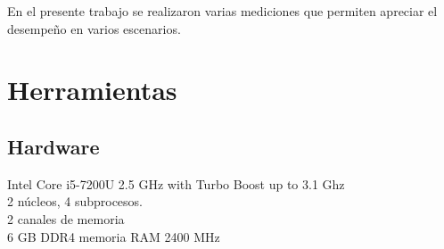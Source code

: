 \documentclass{article}
\begin{document}
En el presente trabajo se realizaron varias mediciones que permiten apreciar el desempeño en varios escenarios.

\newpage
\section{Herramientas}
\subsection{Hardware}
\begin{description}[align=right]
    \item [PC1] Intel Core i5-7200U 2.5 GHz with Turbo Boost up to 3.1 Ghz\\
        2 núcleos, 4 subprocesos.\\
        2 canales de memoria\\
        6 GB DDR4 memoria RAM  2400 MHz


\end{description}
\end{document}
